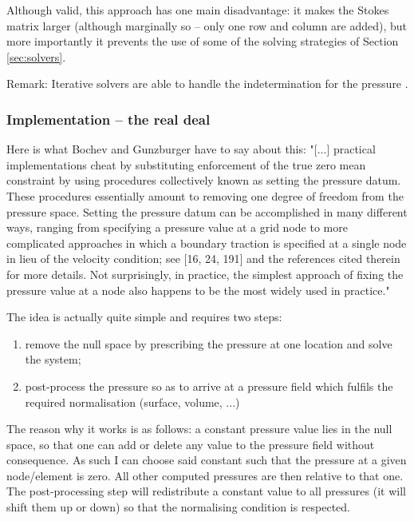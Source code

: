 Although valid, this approach has one main disadvantage: it makes the Stokes matrix larger (although
marginally so -- only one row and column are added), but more importantly it prevents the use of some
of the solving strategies of Section \ref{sec:solvers}.


Remark: Iterative solvers are able to handle the indetermination for the pressure \cite[p. 57]{saramito}.


\subsubsection{Implementation -- the real deal}

Here is what Bochev and Gunzburger \cite[Section 7.6.4]{bogu09} have to say about this:
"[...] practical implementations cheat by substituting enforcement of the true zero mean constraint by using
procedures collectively known as setting the pressure datum. These procedures essentially 
amount to removing one degree of freedom from the pressure space.
Setting the pressure datum can be accomplished in many different ways, ranging
from specifying a pressure value at a grid node to more complicated approaches in
which a boundary traction is specified at a single node in lieu of the velocity condition; 
see [16, 24, 191] and the references cited therein for more details. Not surprisingly, 
in practice, the simplest approach of fixing the pressure value at a node also
happens to be the most widely used in practice."




The idea is actually quite simple and requires two steps:
\begin{enumerate}
\item remove the null space by prescribing the pressure at one location and solve the system;
\item post-process the pressure so as to arrive at a pressure field which fulfils the required normalisation (surface, volume, ...)
\end{enumerate}

The reason why it works is as follows: a constant pressure value lies in the null space, so that one can 
add or delete any value to the pressure field without consequence. As such I can choose said constant such that 
the pressure at a given node/element is zero. All other computed pressures are then relative to that one. 
The post-processing step will redistribute a constant value to all pressures (it will shift them up or down)
so that the normalising condition is respected. 


